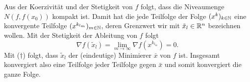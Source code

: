 \\\\
Aus der Koerzivität und der Stetigkeit von $f$ folgt, dass die Niveaumenge $N(f,f(x_0))$ kompakt ist.
Damit hat die jede Teilfolge der Folge $(x^k)_{k\in\mathbb{N}}$ eine konvergente Teilfolge $(x^{k_{l_m}})_{m\in\mathbb{N}}$, deren Grenzwert wir mit $\tilde x_l\in\mathbb{R}^n$
bezeichnen wollen. Mit der Stetigkeit der Ableitung von $f$ folgt
\begin{displaymath}
 \nabla f(\tilde x_l)=\lim_{m\to\infty}\nabla f(x^{k_{l_m}})=0.
\end{displaymath}
Mit ($\dagger$) folgt, dass $\tilde x_l$ der (eindeutige) Minimierer $\bar x$ von $f$ ist. Insgesamt konvergiert also
eine Teilfolge jeder Teilfolge gegen $\bar x$ und somit konvergiert die ganze Folge.
